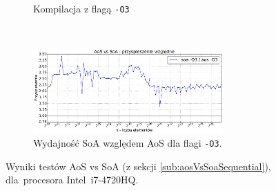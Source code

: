 \begin{figure}
\begin{subfigure}[c]{0.45\textwidth}
        \caption{Kompilacja z flagą \texttt{-O3}}
    \end{subfigure}
    \\
    \vspace{0.55cm}
    \begin{subfigure}[c]{1.0\textwidth}
        \centering
        \includegraphics[width=0.80\textwidth]{images/benchs/aos_vs_soa_normalized}
        \caption{Wydajność SoA względem AoS dla flagi \texttt{-O3}.}
    \end{subfigure}
    \caption{Wyniki testów AoS vs SoA (z sekcji \ref{sub:aosVsSoaSequential}), dla~procesora \mbox{Intel i7-4720HQ}.}
    \label{fig:aosVsSoaSequential}
\end{figure}

